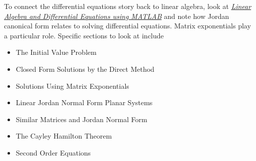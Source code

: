 \documentclass[11pt]{homework}
\begin{document}
To connect the differential equations story back to linear algebra,
look at \textit{\href{/courses/43735/files/folder/textbooks}{Linear
    Algebra and Differential Equations using MATLAB}} and note how
Jordan canonical form relates to solving differential equations.
Matrix exponentials play a particular role.  Specific sections to look
at include
\begin{itemize}
\item {} The Initial Value Problem
\item {} Closed Form Solutions by the Direct Method
\item {} Solutions Using Matrix Exponentials
\item {} Linear Jordan Normal Form Planar Systems
\item {} Similar Matrices and Jordan Normal Form
\item {} The Cayley Hamilton Theorem
\item {} Second Order Equations  
\end{itemize}
\end{document}
